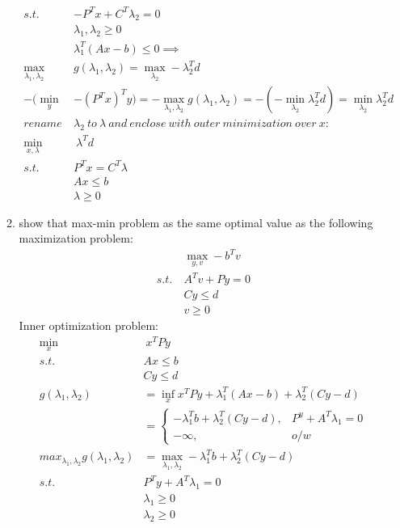 \documentclass[12pt,letter]{article}
\begin{document}
\begin{enumerate}
\begin{enumerate}
\begin{align*}
      s.t.\ & -P^Tx+C^T\lambda_2 = 0\\
             &\lambda_1, \lambda_2 \geq 0\\
             & \lambda_1^T(Ax-b) \leq 0 \implies\\
      \max_{\lambda_1,\lambda_2}\ & g(\lambda_1,\lambda_2) = \max_{\lambda_2} -\lambda_2^Td\\
      -(\min_y & -(P^Tx)^T y) = - \max_{\lambda_1,\lambda_2} g(\lambda_1,\lambda_2) = -(-\min_{\lambda_2} \lambda_2^Td) = \min_{\lambda_2} \lambda_2^Td\\
             rename\ &\lambda_2\ to\ \lambda\ and\ enclose\ with\ outer\ minimization\ over\ x:\\
      \min_{x,\lambda}&\ \lambda^Td\\
      s.t.\ &P^Tx = C^T\lambda\\
             &Ax \leq b\\
             &\lambda \geq 0
    \end{align*}
    \pagebreak
  \item show that max-min problem as the same optimal value as the following maximization problem:
    \begin{align*}
      &\max_{y,v} -b^T v\\
      s.t.\ & A^Tv + Py = 0\\
      &Cy \leq d\\
      &v \geq 0
    \end{align*}
    Inner optimization problem:
    \begin{align*}
      \min_x &\ x^TPy\\
      s.t.\ &Ax \leq b\\
             &Cy \leq d
      \\
      g(\lambda_1,\lambda_2) & = \inf_x x^TPy + \lambda_1^T(Ax-b) + \lambda_2^T(Cy-d)\\
      & =
        \begin{cases}
          -\lambda_1^Tb + \lambda_2^T(Cy-d), & P^y + A^T\lambda_1 = 0\\
          - \infty, & o/w
        \end{cases}\\
      max_{\lambda_1,\lambda_2} g(\lambda_1,\lambda_2) & = \max_{\lambda_1,\lambda_2} -\lambda_1^Tb + \lambda_2^T(Cy-d)\\
      s.t.\ & P^Ty + A^T\lambda_1 = 0\\
      &\lambda_1 \geq 0\\
      &\lambda_2 \geq 0\\

\end{align*}
\end{enumerate}
\end{enumerate}
\end{document}
